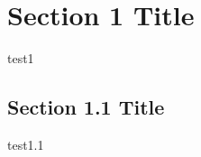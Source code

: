 \section{Section 1 Title}
\label{sec:section1}

test1

\subsection{Section 1.1 Title}
\label{sec:section1.1}

test1.1